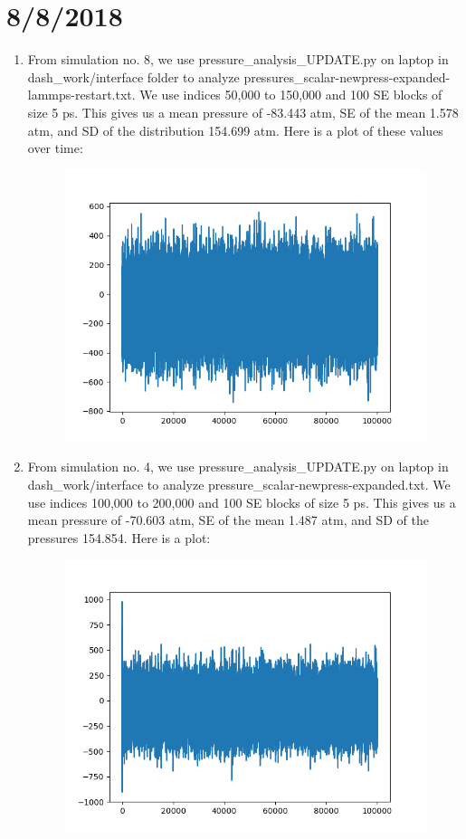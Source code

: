 \documentclass[12pt,reqno]{amsart}
\numberwithin{equation}{section}
\begin{document}
\section{8/8/2018}
\begin{enumerate}
\item From simulation no. 8, we use pressure\_analysis\_UPDATE.py on laptop in dash\_work/interface folder to analyze pressures\_scalar-newpress-expanded-lammps-restart.txt.  We use indices 50,000 to 150,000 and 100 SE blocks of size 5 ps.  This gives us a mean pressure of -83.443 atm, SE of the mean 1.578 atm, and SD of the distribution 154.699 atm.  Here is a plot of these values over time:
\begin{figure}[H]
\centering
\includegraphics[scale=0.7]{pressures_newpress-expanded-lammps-restart1}
\end{figure}
\item From simulation no. 4, we use pressure\_analysis\_UPDATE.py on laptop in dash\_work/interface to analyze pressure\_scalar-newpress-expanded.txt.  We use indices 100,000 to 200,000 and 100 SE blocks of size 5 ps.  This gives us a mean pressure of -70.603 atm, SE of the mean 1.487 atm, and SD of the pressures 154.854.  Here is a plot:
\begin{figure}[H]
\centering
\includegraphics[scale=0.7]{pressures_newpress-expanded}

\end{figure}
\end{enumerate}
\end{document}
